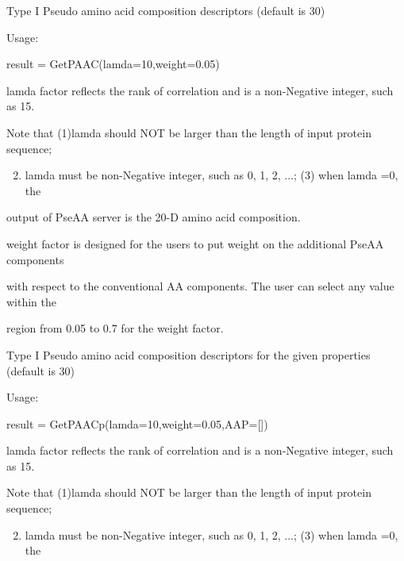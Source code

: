 \documentclass[letterpaper,10pt,english]{sphinxmanual}
\begin{document}
\begin{fulllineitems}
\begin{fulllineitems}
\end{fulllineitems}


\begin{fulllineitems}
\label{reference/PyProteinclass:PyProtein.PyProtein.GetPAAC}
Type I Pseudo amino acid composition descriptors (default is 30)

Usage:

result = GetPAAC(lamda=10,weight=0.05)

lamda factor reflects the rank of correlation and is a non-Negative integer, such as 15.

Note that (1)lamda should NOT be larger than the length of input protein sequence;
\begin{enumerate}
\setcounter{enumi}{1}
\item {} 
lamda must be non-Negative integer, such as 0, 1, 2, ...; (3) when lamda =0, the

\end{enumerate}

output of PseAA server is the 20-D amino acid composition.

weight factor is designed for the users to put weight on the additional PseAA components

with respect to the conventional AA components. The user can select any value within the

region from 0.05 to 0.7 for the weight factor.

\end{fulllineitems}


\begin{fulllineitems}
\label{reference/PyProteinclass:PyProtein.PyProtein.GetPAACp}
Type I Pseudo amino acid composition descriptors for the given properties (default is 30)

Usage:

result = GetPAACp(lamda=10,weight=0.05,AAP={[}{]})

lamda factor reflects the rank of correlation and is a non-Negative integer, such as 15.

Note that (1)lamda should NOT be larger than the length of input protein sequence;
\begin{enumerate}
\setcounter{enumi}{1}
\item {} 
lamda must be non-Negative integer, such as 0, 1, 2, ...; (3) when lamda =0, the


\end{enumerate}
\end{fulllineitems}
\end{fulllineitems}
\end{document}
